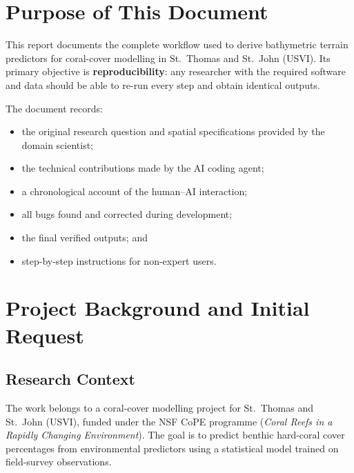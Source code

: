 \documentclass[11pt, a4paper]{article}
\begin{document}
\tableofcontents
\newpage

\section{Purpose of This Document}

This report documents the complete workflow used to derive bathymetric terrain
predictors for coral-cover modelling in St.\ Thomas and St.\ John (USVI).  Its
primary objective is \textbf{reproducibility}: any researcher with the required
software and data should be able to re-run every step and obtain identical
outputs.

The document records:

\begin{itemize}[noitemsep]
  \item the original research question and spatial specifications provided by
        the domain scientist;
  \item the technical contributions made by the AI coding agent;
  \item a chronological account of the human–AI interaction;
  \item all bugs found and corrected during development;
  \item the final verified outputs; and
  \item step-by-step instructions for non-expert users.
\end{itemize}

\section{Project Background and Initial Request}

\subsection{Research Context}

The work belongs to a coral-cover modelling project for St.\ Thomas and
St.\ John (USVI), funded under the NSF CoPE programme
(\textit{Coral Reefs in a Rapidly Changing Environment}).
The goal is to predict benthic hard-coral cover percentages from environmental
predictors using a statistical model trained on field-survey observations.
\end{document}
